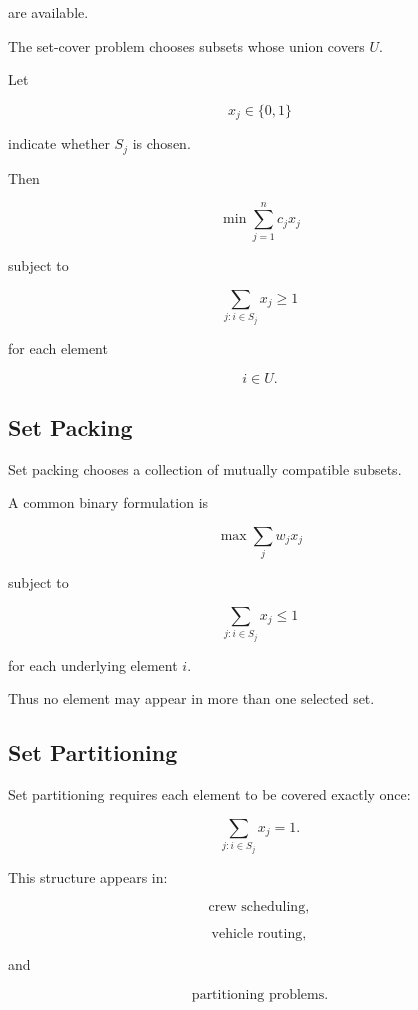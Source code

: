 are available.

The set-cover problem chooses subsets whose union covers \(U\).

Let

\[
x_j\in\{0,1\}
\]

indicate whether \(S_j\) is chosen.

Then

\[
\boxed{
\min
\sum_{j=1}^{n}
c_jx_j
}
\]

subject to

\[
\boxed{
\sum_{j:i\in S_j}
x_j
\geq
1
}
\]

for each element

\[
i\in U.
\]

\subsection{Set Packing}
\label{subsec:set-packing}

Set packing chooses a collection of mutually compatible subsets.

A common binary formulation is

\[
\boxed{
\max
\sum_j
w_jx_j
}
\]

subject to

\[
\boxed{
\sum_{j:i\in S_j}
x_j
\leq
1
}
\]

for each underlying element \(i\).

Thus no element may appear in more than one selected set.

\subsection{Set Partitioning}
\label{subsec:set-partitioning}

Set partitioning requires each element to be covered exactly once:

\[
\boxed{
\sum_{j:i\in S_j}
x_j
=
1.
}
\]

This structure appears in:

\[
\boxed{
\text{crew scheduling},
}
\]

\[
\boxed{
\text{vehicle routing},
}
\]

and

\[
\boxed{
\text{partitioning problems}.
}
\]

